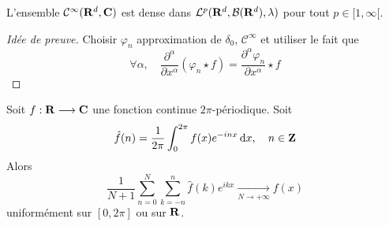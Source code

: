 \begin{thm}
    L'ensemble $\mathcal  C^\infty(\mathbf R^d, \mathbf C)$ est dense dans $\mathcal  L^p(\mathbf R^d, \mathcal  B(\mathbf R^d), \lambda)$ pour tout $p \in  [1, \infty[$.
\end{thm}

\begin{proof}[Idée de preuve]
Choisir $\varphi_n$ approximation de  $\delta_0$,  $\mathcal  C^\infty$ et utiliser le fait que \[
    \forall  \alpha, \quad  \frac{\partial^\alpha}{\partial x^\alpha}(\varphi_n\star f)= \frac{\partial^\alpha \varphi_n}{\partial x^\alpha}\star f
\] 
\end{proof}

\begin{thm}
Soit $f:\mathbf R\longrightarrow \mathbf C$ une fonction continue  $2\pi$-périodique. Soit \[
    \hat{f}(n)=\frac{1}{2\pi}\int_0^{2\pi}f(x)e^{-inx}\mathop{}\!\mathrm d x, \quad  n \in  \mathbf Z
\]
Alors \[
    \frac{1}{N+1}\sum_{n=0}^N\sum_{k=-n}^n \hat{f}(k)e^{ikx} \xrightarrow[N\to +\infty]{}f(x)
\] 
uniformément sur $[0, 2\pi]$ ou sur $\mathbf R$.
\end{thm}

